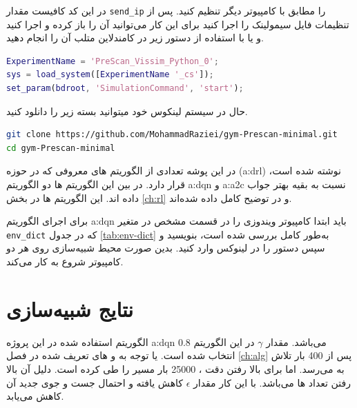 در این کد کافیست مقدار \texttt{send\_ip} را مطابق با  کامپیوتر دیگر تنظیم کنید. پس از تنظیمات فایل سیمولینک را اجرا کنید برای این کار می‌توانید آن را باز کرده و اجرا کنید و یا با استفاده از دستور زیر در کامندلاین متلب آن را انجام دهید.
\begin{latin}
\begin{lstlisting}[language=matlab]
ExperimentName = 'PreScan_Vissim_Python_0';
sys = load_system([ExperimentName '_cs']);
set_param(bdroot, 'SimulationCommand', 'start');
\end{lstlisting}
\end{latin}

حال در سیستم لینکوس خود میتوانید بسته زیر را دانلود کنید.

\begin{latin}
\begin{lstlisting}[language=bash]
git clone https://github.com/MohammadRaziei/gym-Prescan-minimal.git
cd gym-Prescan-minimal
\end{lstlisting}
\end{latin}

در این پوشه تعدادی از الگوریتم های معروفی که در حوزه (\gls{a:drl}) نوشته شده است، قرار دارد.
در بین این الگوریتم ها دو الگوریتم \gls{a:dqn} و \gls{a:a2c} نسبت به بقیه بهتر جواب داده اند. این الگوریتم ها در بخش 
\ref{ch:rl}
و در 
\cite{stable-baselines}
توضیح کامل داده شده‌اند.

برای اجرای الگوریتم \gls{a:dqn} باید ابتدا  کامپیوتر ویندوزی را در قسمت مشخص در متغیر \texttt{env\_dict} که در جدول \ref{tab:env-dict} به‌طور کامل بررسی شده است، بنویسید و سپس دستور  را در  لینوکس وارد کنید. بدین صورت محیط شبیه‌سازی روی هر دو کامپیوتر شروع به کار می‌کند.



\section{نتایج شبیه‌سازی}

الگوریتم استفاده شده در این پروژه \gls{a:dqn} می‌باشد. مقدار $\gamma$ در این الگوریتم $0.8$ انتخاب شده است. یا توجه به  و   های تعریف شده در فصل \ref{ch:alg} پس از 400 بار تلاش به  می‌رسد.
اما برای بالا رفتن دقت ، 25000 بار  مسیر را طی کرده است. دلیل آن بالا رفتن تعداد ها می‌باشد. با این کار مقدار $\epsilon$ کاهش یافته و احتمال جست و جوی  جدید آن کاهش می‌یابد.

